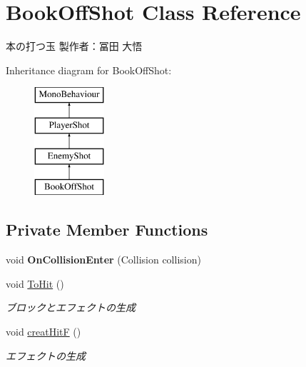 \hypertarget{class_book_off_shot}{}\section{Book\+Off\+Shot Class Reference}
\label{class_book_off_shot}


本の打つ玉 製作者：冨田 大悟  


Inheritance diagram for Book\+Off\+Shot\+:\begin{figure}[H]
\begin{center}
\leavevmode
\includegraphics[height=4.000000cm]{class_book_off_shot}
\end{center}
\end{figure}
\subsection*{Private Member Functions}
\begin{DoxyCompactItemize}
\item 
\mbox{\label{class_book_off_shot_afbfd535f44d90b32ad6ed4e6ac1b7ec5}} 
void {\bfseries On\+Collision\+Enter} (Collision collision)
\item 
void \hyperlink{class_book_off_shot_a7e0628cbb896f41a50c4393748e08f26}{To\+Hit} ()
\begin{DoxyCompactList}\small\item\em ブロックとエフェクトの生成 \end{DoxyCompactList}\item 
void \hyperlink{class_book_off_shot_a1a8d24f8aef2d2cf7c204a7d03ba7c86}{creat\+HitF} ()
\begin{DoxyCompactList}\small\item\em エフェクトの生成 \end{DoxyCompactList}\end{DoxyCompactItemize}
